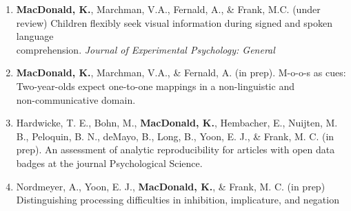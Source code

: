 \documentclass[10pt]{article}
\begin{document}
\begin{enumerate}[resume]
        \item {\bf MacDonald, K.}, Marchman, V.A., Fernald, A., \& Frank, M.C. (under review) Children flexibly seek 
        visual information during signed and spoken language \\comprehension. \emph{Journal of Experimental Psychology: General}

        \item {\bf MacDonald, K.}, Marchman, V.A., \& Fernald, A. (in prep). M-o-o-s as cues: 
        Two-year-olds expect one-to-one mappings in a non-linguistic and \\ non-communicative domain.

        \item Hardwicke, T. E., Bohn, M., {\bf MacDonald, K.}, Hembacher, E., Nuijten, M. B., 
        Peloquin, B. N., deMayo, B., Long, B., Yoon, E. J., \& Frank, M. C. (in prep). An assessment of analytic 
        reproducibility for articles with open data badges at the journal Psychological Science.

        \item Nordmeyer, A., Yoon, E. J., {\bf MacDonald, K.}, \& Frank, M. C. (in prep) \\ Distinguishing processing 
        difficulties in inhibition, implicature, and negation

\end{enumerate}
\end{document}
